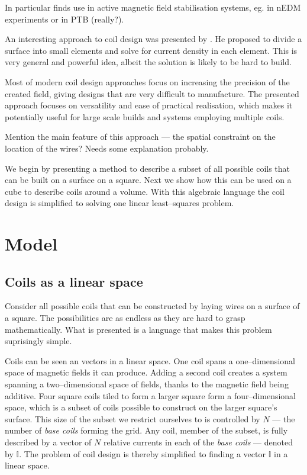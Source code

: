 In particular finds use in active magnetic field stabilisation systems, eg. in nEDM experiments or in PTB (really?).

An interesting approach to coil design was presented by \citeauthor{Compton1982} \citep{Compton1982}. He proposed to divide a surface into small elements and solve for current density in each element. This is very general and powerful idea, albeit the solution is likely to be hard to build.

Most of modern coil design approaches focus on increasing the precision of the created field, giving designs that are very difficult to manufacture. The presented approach focuses on versatility and ease of practical realisation, which makes it potentially useful for large scale builds and systems employing multiple coils.

Mention the main feature of this approach --- the spatial constraint on the location of the wires? Needs some explanation probably.

We begin by presenting a method to describe a subset of all possible coils that can be built on a surface on a square. Next we show how this can be used on a cube to describe coils around a volume. With this algebraic language the coil design is simplified to solving one linear least--squares problem.


\section{Model}
\subsection{Coils as a linear space}
Consider all possible coils that can be constructed by laying wires on a surface of a square. The possibilities are as endless as they are hard to grasp mathematically. What is presented is a language that makes this problem suprisingly simple.

Coils can be seen an vectors in a linear space. One coil spans a one--dimensional space of magnetic fields it can produce. Adding a second coil creates a system spanning a two--dimensional space of fields, thanks to the magnetic field being additive. Four square coils tiled to form a larger square form a four--dimensional space, which is a subset of coils possible to construct on the larger square's surface. This size of the subset we restrict ourselves to is controlled by $N$ --- the number of \emph{base coils} forming the grid. Any coil, member of the subset, is fully described by a vector of $N$ relative currents in each of the \emph{base coils} --- denoted by $\mathbb{I}$. The problem of coil design is thereby simplified to finding a vector $\mathbb{I}$ in a linear space.

